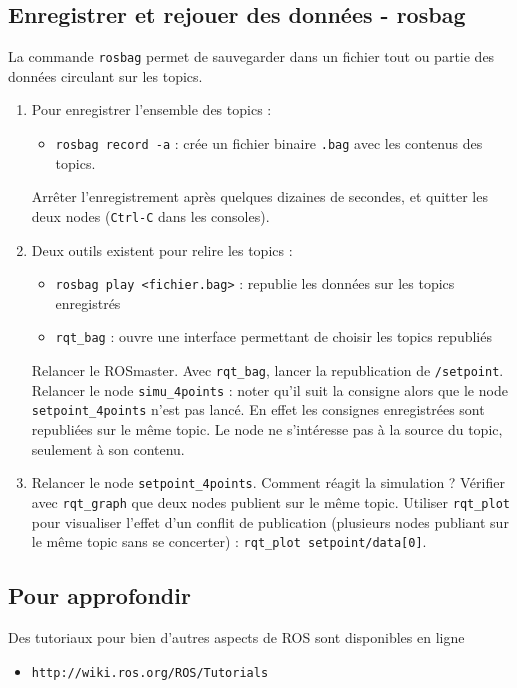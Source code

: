 \documentclass[12pt,a4paper]{article}
\begin{document}
\subsection{Enregistrer et rejouer des données - rosbag}
La commande \texttt{rosbag} permet de sauvegarder dans un fichier tout ou partie des données circulant sur les topics.
\begin{enumerate}

\item Pour enregistrer l'ensemble des topics : 
\begin{itemize}
\item \texttt{rosbag record -a} : crée un fichier binaire \texttt{.bag} avec les contenus des topics.
\end{itemize}
Arrêter l'enregistrement après quelques dizaines de secondes, et quitter les deux nodes (\texttt{Ctrl-C} dans les consoles).
\item Deux outils existent pour relire les topics :
\begin{itemize}
\item \texttt{rosbag play <fichier.bag>} : republie les données sur les topics enregistrés
\item \texttt{rqt\_bag} : ouvre une interface permettant de choisir les topics republiés
\end{itemize}
Relancer le ROSmaster. Avec \texttt{rqt\_bag}, lancer la republication de \texttt{/setpoint}.
Relancer le node \texttt{simu\_4points} : noter qu'il suit la consigne alors que le node \texttt{setpoint\_4points} n'est pas lancé. En effet les consignes enregistrées sont republiées sur le même topic. Le node ne s'intéresse pas à la source du topic, seulement à son contenu. 

\item Relancer le node \texttt{setpoint\_4points}. Comment réagit la simulation ? 
Vérifier avec \texttt{rqt\_graph} que deux nodes publient sur le même topic.
Utiliser \texttt{rqt\_plot} pour visualiser l'effet d'un conflit de publication (plusieurs nodes publiant sur le même topic sans se concerter) : \texttt{rqt\_plot setpoint/data[0]}.
\end{enumerate}

\subsection*{Pour approfondir}

Des tutoriaux pour bien d'autres aspects de ROS sont disponibles en ligne
\begin{itemize}
\item \texttt{http://wiki.ros.org/ROS/Tutorials}
\end{itemize}
\end{document}
